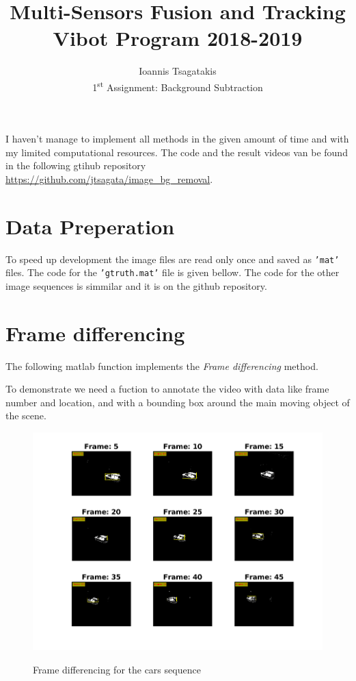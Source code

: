 \documentclass[a4paper,12pt]{article}
\begin{document}
\title{ Multi-Sensors Fusion and Tracking\\Vibot Program 2018-2019}
\author{Ioannis Tsagatakis\\
1\textsuperscript{st} Assignment: Background Subtraction} 
 
\maketitle

I haven't manage to implement all methods in the given amount of time and with my limited computational resources. The code and the result videos van be found in the following gtihub repository \url{https://github.com/jtsagata/image_bg_removal}.

\section{Data Preperation}
To speed up development the image files are read only once and saved as \texttt{'mat'} files. The code for the \texttt{'gtruth.mat'} file is given bellow. The code for the other image sequences is simmilar and it is on the github repository.



\section{Frame differencing}
The following matlab function implements the \textit{Frame differencing} method.



To demonstrate we need a fuction to annotate the video with data like frame number and location, and with a bounding box around the main moving object of the scene.

\begin{figure}[Ht]
\centering
\includegraphics{../Videos/bgsub_framediff_cars.png}
\label{fig:fdiff_cars}
\caption{Frame differencing for the cars sequence}
\end{figure}
\end{document}
